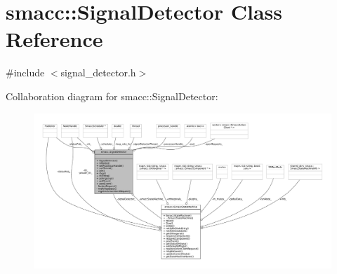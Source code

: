 \hypertarget{classsmacc_1_1SignalDetector}{}\section{smacc\+:\+:Signal\+Detector Class Reference}
\label{classsmacc_1_1SignalDetector}


{\ttfamily \#include $<$signal\+\_\+detector.\+h$>$}



Collaboration diagram for smacc\+:\+:Signal\+Detector\+:
\nopagebreak
\begin{figure}[H]
\begin{center}
\leavevmode
\includegraphics[width=350pt]{classsmacc_1_1SignalDetector__coll__graph}
\end{center}
\end{figure}
